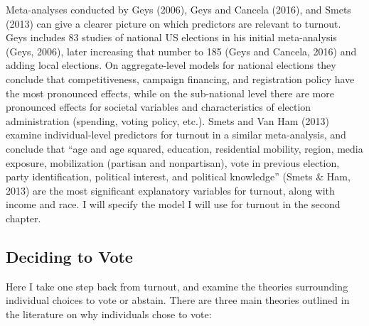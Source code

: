 \documentclass[12pt,twoside]{reedthesis}
\begin{document}
  Meta-analyses conducted by Geys (2006), Geys and Cancela (2016), and
  Smets (2013) can give a clearer picture on which predictors are relevant
  to turnout. Geys includes 83 studies of national US elections in his
  initial meta-analysis (Geys, 2006), later increasing that number to 185
  (Geys and Cancela, 2016) and adding local elections. On aggregate-level
  models for national elections they conclude that competitiveness,
  campaign financing, and registration policy have the most pronounced
  effects, while on the sub-national level there are more pronounced
  effects for societal variables and characteristics of election
  administration (spending, voting policy, etc.). Smets and Van Ham (2013)
  examine individual-level predictors for turnout in a similar
  meta-analysis, and conclude that ``age and age squared, education,
  residential mobility, region, media exposure, mobilization (partisan and
  nonpartisan), vote in previous election, party identification, political
  interest, and political knowledge'' (Smets \& Ham, 2013) are the most
  significant explanatory variables for turnout, along with income and
  race. I will specify the model I will use for turnout in the second
  chapter.
  
  \subsection{Deciding to Vote}\label{deciding-to-vote}
  
  Here I take one step back from turnout, and examine the theories
  surrounding individual choices to vote or abstain. There are three main
  theories outlined in the literature on why individuals chose to vote:
  
\end{document}
